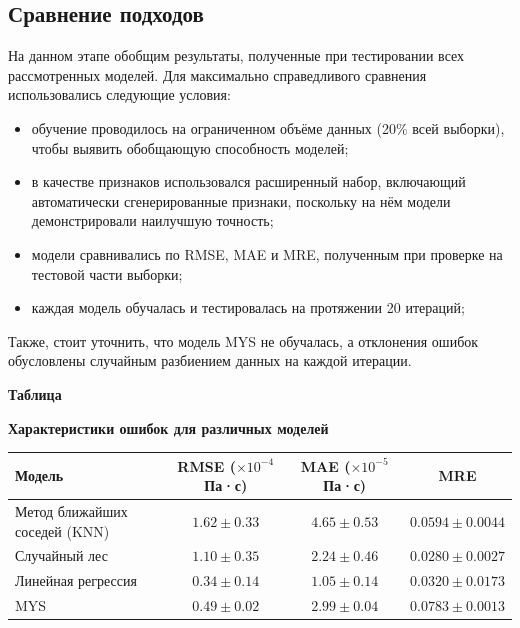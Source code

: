 \documentclass[a4paper,12pt]{article}
\newcommand{\TableNumberRight}{
  \refstepcounter{table}%
  \noindent\hfill\textbf{Таблица \thetable}
}
\begin{document}
  \subsection{Сравнение подходов}

    На данном этапе обобщим результаты, полученные при тестировании всех рассмотренных моделей. Для максимально справедливого сравнения использовались следующие условия:
    \begin{itemize}
      \item обучение проводилось на ограниченном объёме данных (20\% всей выборки), чтобы выявить обобщающую способность моделей;
      \item в качестве признаков использовался расширенный набор, включающий автоматически сгенерированные признаки, поскольку на нём модели демонстрировали наилучшую точность;
      \item модели сравнивались по RMSE, MAE и MRE, полученным при проверке на тестовой части выборки;
      \item каждая модель обучалась и тестировалась на протяжении 20 итераций;
    \end{itemize}

    Также, стоит уточнить, что модель MYS не обучалась, а отклонения ошибок обусловлены случайным разбиением данных на каждой итерации.
    
    \begin{table}[ht!]
      \TableNumberRight
      \begin{center}
        \textbf{Характеристики ошибок для различных моделей}
        \vspace*{\fill}
      \end{center}
    
      \vspace{0.8ex}
      \noindent
      \begin{tabular}{|l|c|c|c|}
          \hline
          \textbf{Модель} & \textbf{RMSE} (\(\times 10^{-4}\) Па·с) & \textbf{MAE} (\(\times 10^{-5}\) Па·с) & \textbf{MRE} \\
          \hline
          Метод ближайших соседей (KNN) & \( 1.62 \pm 0.33 \) & \( 4.65 \pm 0.53 \) & \( 0.0594 \pm 0.0044 \) \\
          Случайный лес                 & \( 1.10 \pm 0.35 \) & \( 2.24 \pm 0.46 \) & \( 0.0280 \pm 0.0027 \) \\
          Линейная регрессия            & \( 0.34 \pm 0.14 \) & \( 1.05 \pm 0.14 \) & \( 0.0320 \pm 0.0173 \) \\
          MYS                           & \( 0.49 \pm 0.02 \) & \( 2.99 \pm 0.04 \) & \( 0.0783 \pm 0.0013 \) \\
          \hline
      \end{tabular}

      \label{tab:model_comparison}
    \end{table}
    
\end{document}
